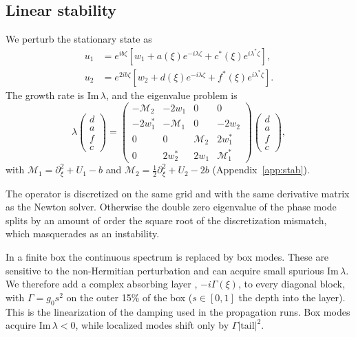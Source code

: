 \documentclass[pra,twocolumn,superscriptaddress,longbibliography]{revtex4-2}
\newcommand{\Img}{\mathrm{Im}\,}
\begin{document}
\subsection{Linear stability}\label{sec:stab}
We perturb the stationary state as
\begin{align}
u_1 &= e^{ib\zeta}\left[w_1 + a(\xi)e^{-i\lambda\zeta} + c^{*}(\xi)e^{i\lambda^{*}\zeta}\right],\nonumber\\
u_2 &= e^{2ib\zeta}\left[w_2 + d(\xi)e^{-i\lambda\zeta} + f^{*}(\xi)e^{i\lambda^{*}\zeta}\right].
\end{align}
The growth rate is $\Img\lambda$, and the eigenvalue problem is
\begin{equation}
\lambda\begin{pmatrix}d\\a\\f\\c\end{pmatrix} =
\begin{pmatrix}
-\mathcal M_2 & -2w_1 & 0 & 0\\
-2w_1^{*} & -\mathcal M_1 & 0 & -2w_2\\
0 & 0 & \mathcal M_2 & 2w_1^{*}\\
0 & 2w_2^{*} & 2w_1 & \mathcal M_1^{*}
\end{pmatrix}
\begin{pmatrix}d\\a\\f\\c\end{pmatrix}, \label{eq:stab}
\end{equation}
with $\mathcal M_1 = \partial_\xi^2 + U_1 - b$ and
$\mathcal M_2 = \tfrac12\partial_\xi^2 + U_2 - 2b$ (Appendix~\ref{app:stab}).

The operator is discretized \cite{Yang2010} on the same grid and with the same derivative matrix as
the Newton solver. Otherwise the double zero eigenvalue of the phase mode splits by an amount of order the
square root of the discretization mismatch, which masquerades as an instability.

In a finite box the continuous spectrum is replaced by box modes. These are sensitive to the
non-Hermitian perturbation and can acquire small spurious $\Img\lambda$. We therefore add a
complex absorbing layer \cite{Riss1993}, $-i\Gamma(\xi)$, to every diagonal block, with
$\Gamma = g_0 s^2$ on the outer 15\% of the box ($s\in[0,1]$ the depth into the layer). This is
the linearization of the damping used in the propagation runs. Box modes acquire
$\Img\lambda<0$, while localized modes shift only by $\Gamma|\text{tail}|^2$.
\end{document}
